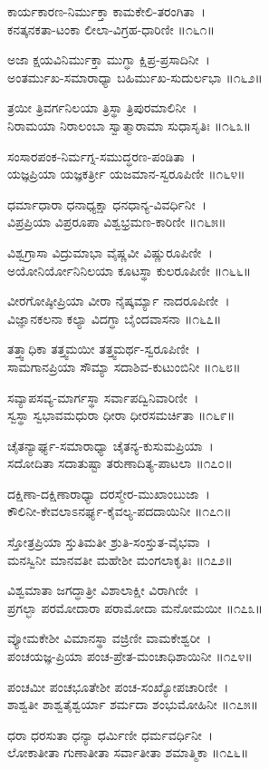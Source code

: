 ಕಾರ್ಯಕಾರಣ-ನಿರ್ಮುಕ್ತಾ ಕಾಮಕೇಲಿ-ತರಂಗಿತಾ~।\\
ಕನತ್ಕನಕತಾ-ಟಂಕಾ ಲೀಲಾ-ವಿಗ್ರಹ-ಧಾರಿಣೀ ॥೧೬೧॥

ಅಜಾ ಕ್ಷಯವಿನಿರ್ಮುಕ್ತಾ ಮುಗ್ಧಾ ಕ್ಷಿಪ್ರ-ಪ್ರಸಾದಿನೀ~।\\
ಅಂತರ್ಮುಖ-ಸಮಾರಾಧ್ಯಾ ಬಹಿರ್ಮುಖ-ಸುದುರ್ಲಭಾ ॥೧೬೨॥

ತ್ರಯೀ ತ್ರಿವರ್ಗನಿಲಯಾ ತ್ರಿಸ್ಥಾ ತ್ರಿಪುರಮಾಲಿನೀ~।\\
ನಿರಾಮಯಾ ನಿರಾಲಂಬಾ ಸ್ವಾತ್ಮಾರಾಮಾ ಸುಧಾಸೃತಿಃ ॥೧೬೩॥

ಸಂಸಾರಪಂಕ-ನಿರ್ಮಗ್ನ-ಸಮುದ್ಧರಣ-ಪಂಡಿತಾ~।\\
ಯಜ್ಞಪ್ರಿಯಾ ಯಜ್ಞಕರ್ತ್ರೀ ಯಜಮಾನ-ಸ್ವರೂಪಿಣೀ ॥೧೬೪॥

ಧರ್ಮಾಧಾರಾ ಧನಾಧ್ಯಕ್ಷಾ ಧನಧಾನ್ಯ-ವಿವರ್ಧಿನೀ~।\\
ವಿಪ್ರಪ್ರಿಯಾ ವಿಪ್ರರೂಪಾ ವಿಶ್ವಭ್ರಮಣ-ಕಾರಿಣೀ ॥೧೬೫॥

ವಿಶ್ವಗ್ರಾಸಾ ವಿದ್ರುಮಾಭಾ ವೈಷ್ಣವೀ ವಿಷ್ಣುರೂಪಿಣೀ~।\\
ಅಯೋನಿರ್ಯೋನಿನಿಲಯಾ ಕೂಟಸ್ಥಾ ಕುಲರೂಪಿಣೀ ॥೧೬೬॥

ವೀರಗೋಷ್ಠೀಪ್ರಿಯಾ ವೀರಾ ನೈಷ್ಕರ್ಮ್ಯಾ  ನಾದರೂಪಿಣೀ~।\\
ವಿಜ್ಞಾನಕಲನಾ ಕಲ್ಯಾ ವಿದಗ್ಧಾ ಬೈಂದವಾಸನಾ ॥೧೬೭॥

ತತ್ತ್ವಾಧಿಕಾ ತತ್ತ್ವಮಯೀ ತತ್ತ್ವಮರ್ಥ-ಸ್ವರೂಪಿಣೀ~।\\
ಸಾಮಗಾನಪ್ರಿಯಾ ಸೌಮ್ಯಾ ಸದಾಶಿವ-ಕುಟುಂಬಿನೀ ॥೧೬೮॥

ಸವ್ಯಾಪಸವ್ಯ-ಮಾರ್ಗಸ್ಥಾ ಸರ್ವಾಪದ್ವಿನಿವಾರಿಣೀ~।\\
ಸ್ವಸ್ಥಾ ಸ್ವಭಾವಮಧುರಾ ಧೀರಾ ಧೀರಸಮರ್ಚಿತಾ ॥೧೬೯॥

ಚೈತನ್ಯಾರ್ಘ್ಯ-ಸಮಾರಾಧ್ಯಾ ಚೈತನ್ಯ-ಕುಸುಮಪ್ರಿಯಾ~।\\
ಸದೋದಿತಾ ಸದಾತುಷ್ಟಾ ತರುಣಾದಿತ್ಯ-ಪಾಟಲಾ ॥೧೭೦॥

ದಕ್ಷಿಣಾ-ದಕ್ಷಿಣಾರಾಧ್ಯಾ ದರಸ್ಮೇರ-ಮುಖಾಂಬುಜಾ~।\\
ಕೌಲಿನೀ-ಕೇವಲಾಽನರ್ಘ್ಯ-ಕೈವಲ್ಯ-ಪದದಾಯಿನೀ ॥೧೭೧॥

ಸ್ತೋತ್ರಪ್ರಿಯಾ ಸ್ತುತಿಮತೀ ಶ್ರುತಿ-ಸಂಸ್ತುತ-ವೈಭವಾ~।\\
ಮನಸ್ವಿನೀ ಮಾನವತೀ ಮಹೇಶೀ ಮಂಗಲಾಕೃತಿಃ ॥೧೭೨॥

ವಿಶ್ವಮಾತಾ ಜಗದ್ಧಾತ್ರೀ ವಿಶಾಲಾಕ್ಷೀ ವಿರಾಗಿಣೀ~।\\
ಪ್ರಗಲ್ಭಾ ಪರಮೋದಾರಾ ಪರಾಮೋದಾ ಮನೋಮಯೀ ॥೧೭೩॥

ವ್ಯೋಮಕೇಶೀ ವಿಮಾನಸ್ಥಾ ವಜ್ರಿಣೀ ವಾಮಕೇಶ್ವರೀ~।\\
ಪಂಚಯಜ್ಞ-ಪ್ರಿಯಾ ಪಂಚ-ಪ್ರೇತ-ಮಂಚಾಧಿಶಾಯಿನೀ ॥೧೭೪॥

ಪಂಚಮೀ ಪಂಚಭೂತೇಶೀ ಪಂಚ-ಸಂಖ್ಯೋಪಚಾರಿಣೀ~।\\
ಶಾಶ್ವತೀ ಶಾಶ್ವತೈಶ್ವರ್ಯಾ ಶರ್ಮದಾ ಶಂಭುಮೋಹಿನೀ ॥೧೭೫॥

ಧರಾ ಧರಸುತಾ ಧನ್ಯಾ ಧರ್ಮಿಣೀ ಧರ್ಮವರ್ಧಿನೀ~।\\
ಲೋಕಾತೀತಾ ಗುಣಾತೀತಾ ಸರ್ವಾತೀತಾ ಶಮಾತ್ಮಿಕಾ ॥೧೭೬॥

